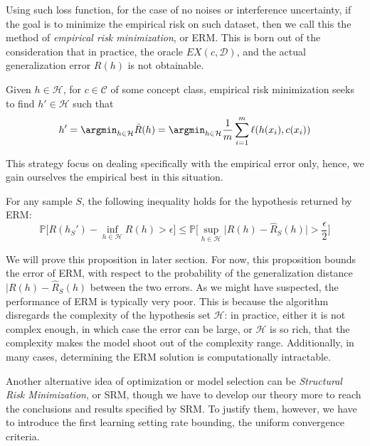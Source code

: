 Using such loss function, for the case of no noises or interference uncertainty, if the goal is to minimize the empirical risk on such dataset, then we call this the method of \textit{empirical risk minimization}, or ERM. This is born out of the consideration that in practice, the oracle $EX(c,\mathcal{D})$, and the actual generalization error $R(h)$ is not obtainable. 

\begin{definition}
    Given $h\in \mathcal{H}$, for $c\in \mathcal{C}$ of some concept class, empirical risk minimization seeks to find $h'\in\mathcal{H}$ such that \begin{equation}
        h' = \argmin_{h\in \mathcal{H}} \hat{R}(h)= \argmin_{h\in\mathcal{H}} \frac{1}{m}\sum^{m}_{i=1} \ell(h(x_{i}),c(x_{i}))
    \end{equation} 
\end{definition}
This strategy focus on dealing specifically with the empirical error only, hence, we gain ourselves the empirical best in this situation. 
\begin{proposition}
    For any sample $S$, the following inequality holds for the hypothesis returned by ERM: 
    \begin{equation}
        \mathbb{P}\Big[R(h_{S}')- \inf_{h\in \mathcal{H}}R(h) > \epsilon\Big] \leq \mathbb{P}\Big[ \sup_{h\in \mathcal{H}} \lvert R(h)- \hat{R}_{S}(h) \rvert > \frac{\epsilon}{2} \Big]
    \end{equation}
\end{proposition}
We will prove this proposition in later section. For now, this proposition bounds the error of ERM, with respect to the probability of the generalization distance $\lvert R(h)- \hat{R}_{S}(h)$ between the two errors. As we might have suspected, the performance of ERM is typically very poor. This is because the algorithm disregards the complexity of the hypothesis set $\mathcal{H}$: in practice, either it is not complex enough, in which case the error can be large, or $\mathcal{H}$ is so rich, that the complexity makes the model shoot out of the complexity range. Additionally, in many cases, determining the ERM solution is computationally intractable. 

Another alternative idea of optimization or model selection can be \textit{Structural Risk Minimization}, or SRM, though we have to develop our theory more to reach the conclusions and results specified by SRM. To justify them, however, we have to introduce the first learning setting rate bounding, the uniform convergence criteria.


